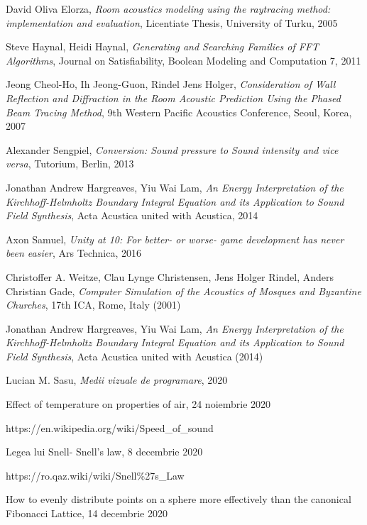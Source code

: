\begin{thebibliography}{99.}%

 David Oliva Elorza, \textit{Room acoustics modeling using the raytracing method: implementation and evaluation}, Licentiate Thesis, University of Turku, 2005

 Steve Haynal, Heidi Haynal, \textit{Generating and Searching Families of FFT Algorithms}, Journal on Satisfiability, Boolean Modeling and Computation 7, 2011

 Jeong Cheol-Ho, Ih Jeong-Guon, Rindel Jens Holger, \textit{Consideration of Wall Reflection and Diffraction in the Room Acoustic Prediction Using the Phased Beam Tracing Method}, 9th Western Pacific Acoustics Conference, Seoul, Korea, 2007

 Alexander Sengpiel, \textit{Conversion: Sound pressure to Sound intensity and vice versa}, Tutorium, Berlin, 2013

 Jonathan Andrew Hargreaves, Yiu Wai Lam, \textit{An Energy Interpretation of the Kirchhoff-Helmholtz Boundary Integral Equation and its Application to Sound Field Synthesis}, Acta Acustica united with Acustica, 2014

 Axon Samuel, \textit{Unity at 10: For better- or worse- game development has never been easier}, Ars Technica, 2016

 Christoffer A. Weitze, Clau Lynge Christensen, Jens Holger Rindel, Anders Christian Gade, \textit{Computer Simulation of the Acoustics of Mosques and Byzantine Churches}, 17th ICA, Rome, Italy (2001)

 Jonathan Andrew Hargreaves, Yiu Wai Lam, \textit{An Energy Interpretation of the Kirchhoff-Helmholtz Boundary Integral Equation and its Application to Sound Field Synthesis}, Acta Acustica united with Acustica (2014)

 Lucian M. Sasu, \textit{Medii vizuale de programare}, 2020

 Effect of temperature on properties of air, 24 noiembrie 2020

https://en.wikipedia.org/wiki/Speed\_of\_sound

 Legea lui Snell- Snell's law, 8 decembrie 2020

https://ro.qaz.wiki/wiki/Snell\%27s\_Law

 How to evenly distribute points on a sphere more effectively than the canonical Fibonacci Lattice, 14 decembrie 2020


\end{thebibliography}
